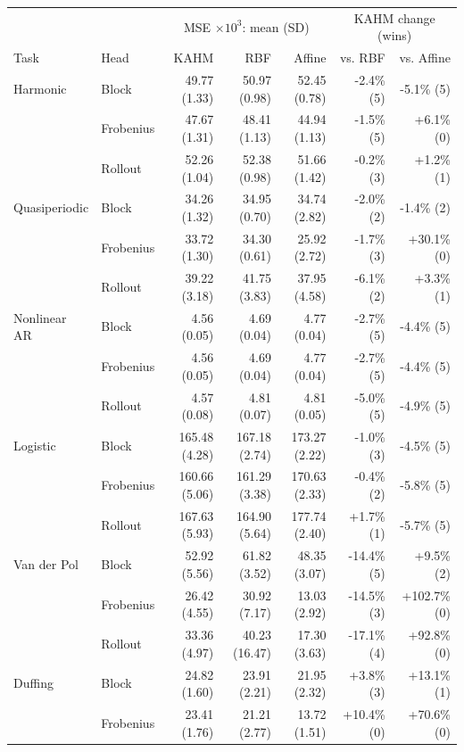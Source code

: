 \begin{table}[t]
\centering\small
\setlength{\tabcolsep}{3pt}
\begin{tabular}{llrrrrr}
\toprule
& & \multicolumn{3}{c}{MSE $\times 10^3$: mean (SD)} & \multicolumn{2}{c}{KAHM change (wins)}\\
Task & Head & KAHM & RBF & Affine & vs. RBF & vs. Affine\\
\midrule
Harmonic & Block & 49.77 (1.33) & 50.97 (0.98) & 52.45 (0.78) & -2.4\% (5) & -5.1\% (5)\\
 & Frobenius & 47.67 (1.31) & 48.41 (1.13) & 44.94 (1.13) & -1.5\% (5) & +6.1\% (0)\\
 & Rollout & 52.26 (1.04) & 52.38 (0.98) & 51.66 (1.42) & -0.2\% (3) & +1.2\% (1)\\
\addlinespace[3pt]
Quasiperiodic & Block & 34.26 (1.32) & 34.95 (0.70) & 34.74 (2.82) & -2.0\% (2) & -1.4\% (2)\\
 & Frobenius & 33.72 (1.30) & 34.30 (0.61) & 25.92 (2.72) & -1.7\% (3) & +30.1\% (0)\\
 & Rollout & 39.22 (3.18) & 41.75 (3.83) & 37.95 (4.58) & -6.1\% (2) & +3.3\% (1)\\
\addlinespace[3pt]
Nonlinear AR & Block & 4.56 (0.05) & 4.69 (0.04) & 4.77 (0.04) & -2.7\% (5) & -4.4\% (5)\\
 & Frobenius & 4.56 (0.05) & 4.69 (0.04) & 4.77 (0.04) & -2.7\% (5) & -4.4\% (5)\\
 & Rollout & 4.57 (0.08) & 4.81 (0.07) & 4.81 (0.05) & -5.0\% (5) & -4.9\% (5)\\
\addlinespace[3pt]
Logistic & Block & 165.48 (4.28) & 167.18 (2.74) & 173.27 (2.22) & -1.0\% (3) & -4.5\% (5)\\
 & Frobenius & 160.66 (5.06) & 161.29 (3.38) & 170.63 (2.33) & -0.4\% (2) & -5.8\% (5)\\
 & Rollout & 167.63 (5.93) & 164.90 (5.64) & 177.74 (2.40) & +1.7\% (1) & -5.7\% (5)\\
\addlinespace[3pt]
Van der Pol & Block & 52.92 (5.56) & 61.82 (3.52) & 48.35 (3.07) & -14.4\% (5) & +9.5\% (2)\\
 & Frobenius & 26.42 (4.55) & 30.92 (7.17) & 13.03 (2.92) & -14.5\% (3) & +102.7\% (0)\\
 & Rollout & 33.36 (4.97) & 40.23 (16.47) & 17.30 (3.63) & -17.1\% (4) & +92.8\% (0)\\
\addlinespace[3pt]
Duffing & Block & 24.82 (1.60) & 23.91 (2.21) & 21.95 (2.32) & +3.8\% (3) & +13.1\% (1)\\
 & Frobenius & 23.41 (1.76) & 21.21 (2.77) & 13.72 (1.51) & +10.4\% (0) & +70.6\% (0)\\

\end{tabular}
\end{table}

